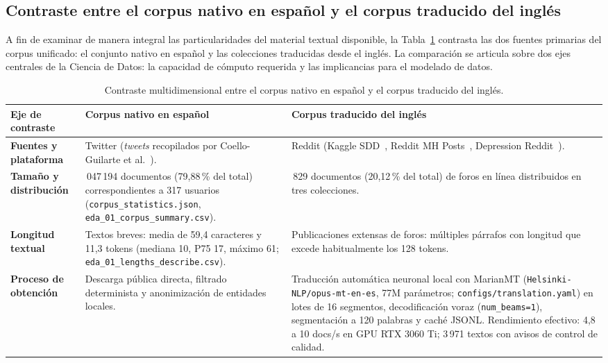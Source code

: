 \documentclass[12pt,a4paper]{article}
\begin{document}
\subsection{Contraste entre el corpus nativo en español y el corpus traducido del inglés}
\label{sec:contraste_corpora}
A fin de examinar de manera integral las particularidades del material textual disponible, la Tabla~\ref{tab:contraste_corpora} contrasta las dos fuentes primarias del corpus unificado: el conjunto nativo en español y las colecciones traducidas desde el inglés. La comparación se articula sobre dos ejes centrales de la Ciencia de Datos: la capacidad de cómputo requerida y las implicancias para el modelado de datos.

\begin{table}[H]
\centering
\footnotesize
\caption{Contraste multidimensional entre el corpus nativo en español y el corpus traducido del inglés.}
\label{tab:contraste_corpora}
\begin{tabularx}{\textwidth}{>{\raggedright\arraybackslash}p{2.8cm}>{\raggedright\arraybackslash}X>{\raggedright\arraybackslash}X}
\toprule
\textbf{Eje de contraste} & \textbf{Corpus nativo en español} & \textbf{Corpus traducido del inglés} \\
\midrule
\textbf{Fuentes y plataforma} & Twitter (\emph{tweets} recopilados por Coello-Guilarte et al.~\cite{coello2019}). & Reddit (Kaggle SDD~\cite{komati2021sdd}, Reddit MH Posts~\cite{solomonk_rmhp}, Depression Reddit~\cite{mrjunos_drc}). \\
\addlinespace
\textbf{Tamaño y distribución} & 1\,047\,194 documentos (79{,}88\,\% del total) correspondientes a 317 usuarios (\texttt{corpus\_statistics.json}, \texttt{eda\_01\_corpus\_summary.csv}). & 263\,829 documentos (20{,}12\,\% del total) de foros en línea distribuidos en tres colecciones. \\
\addlinespace
\textbf{Longitud textual} & Textos breves: media de 59{,}4 caracteres y 11{,}3 tokens (mediana 10, P75 17, máximo 61; \texttt{eda\_01\_lengths\_describe.csv}). & Publicaciones extensas de foros: múltiples párrafos con longitud que excede habitualmente los 128 tokens. \\
\addlinespace
\textbf{Proceso de obtención} & Descarga pública directa, filtrado determinista y anonimización de entidades locales. & Traducción automática neuronal local con MarianMT (\texttt{Helsinki-NLP/opus-mt-en-es}, 77M parámetros; \texttt{configs/translation.yaml}) en lotes de 16 segmentos, decodificación voraz (\texttt{num\_beams=1}), segmentación a 120 palabras y caché JSONL. Rendimiento efectivo: 4{,}8 a 10 docs/s en GPU RTX 3060 Ti; 3\,971 textos con avisos de control de calidad. \\

\end{tabularx}
\end{table}
\end{document}
